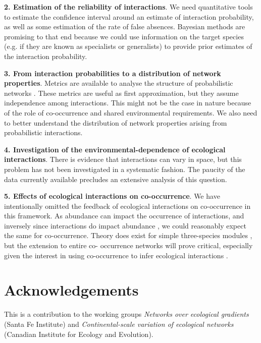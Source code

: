 \documentclass[12pt]{article}
\begin{document}
\textbf{2. Estimation of the reliability of interactions}. We need quantitative tools
to estimate the confidence interval around an estimate of interaction
probability, as well as some estimation of the rate of false absences.
Bayesian methods are promising to that end because we could use information on
the target species (e.g. if they are known as specialists or generalists) to
provide prior estimates of the interaction probability.

\textbf{3. From interaction probabilities to a distribution of network properties}.
Metrics are available to analyse the structure of probabilistic networks
\citep{Poisot2015c}. These metrics are useful as first approximation, but they
assume independence among interactions. This might not be the case in nature
because of the role of co-occurrence and shared environmental requirements. We
also need to better understand the distribution of network properties arising
from probabilistic interactions.

\textbf{4. Investigation of the environmental-dependence of ecological interactions}.
There is evidence that interactions can vary in space, but this problem has
not been investigated in a systematic fashion. The paucity of the data
currently available precludes an extensive analysis of this question.

\textbf{5. Effects of ecological interactions on co-occurrence}. We have
intentionally omitted the feedback of ecological interactions on co-occurrence
in this framework. As abundance can impact the occurrence of interactions, and
inversely since interactions do impact abundance \citep{Canard2014}, we could
reasonably expect the same for co-occurrence. Theory does exist for simple
three-species modules \citep{Cazelles2015}, but the extension to entire co-
occurrence networks will prove critical, especially given the interest in
using co-occurrence to infer ecological interactions \citep{Morales2015,
Morueta-Holme2016}.

\section*{Acknowledgements}
This is a contribution to the working groups \emph{Networks over ecological
gradients} (Santa Fe Institute) and \emph{Continental-scale variation of
ecological networks} (Canadian Institute for Ecology and Evolution). 
\newpage


\end{document}
